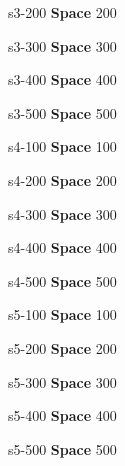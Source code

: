 \documentclass{beamer}
\def \firstcat {\textbf{Space}}
\begin{document}
	
	\content                       
	{s3-200}                     
	{\firstcat}                          
	{200}{             
	}
	
	
	\content           
	{s3-300}                     
	{\firstcat}                          
	{300}{                       
	}
	
	
	\content                       
	{s3-400}                     
	{\firstcat}                          
	{400}{       
	}
	
	
	\content                       
	{s3-500}                     
	{\firstcat}                          
	{500}{    
	}
	
	
	\content                       
	{s4-100}                     
	{\firstcat}                          
	{100}{    
	}
	
	
	\content                       
	{s4-200}                     
	{\firstcat}                          
	{200}{             
	}
	
	
	\content           
	{s4-300}                     
	{\firstcat}                          
	{300}{                       
	}
	
	
	\content                       
	{s4-400}                     
	{\firstcat}                          
	{400}{       
	}
	
	
	\content                       
	{s4-500}                     
	{\firstcat}                          
	{500}{    
	}
	
	
	\content                       
	{s5-100}                     
	{\firstcat}                          
	{100}{    
	}
	
	
	\content                       
	{s5-200}                     
	{\firstcat}                          
	{200}{             
	}
	
	
	\content           
	{s5-300}                     
	{\firstcat}                          
	{300}{                       
	}
	
	
	\content                       
	{s5-400}                     
	{\firstcat}                          
	{400}{       
	}
	
	
	\content                       
	{s5-500}                     
	{\firstcat}                          
	{500}{    
	}
\end{document}
